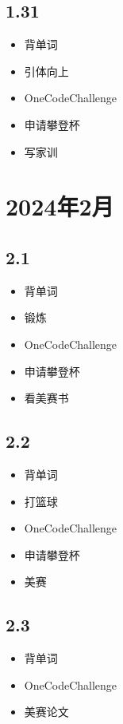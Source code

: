 \documentclass[UTF8]{ctexart}
\begin{document}
\subsection*{1.31}
\begin{itemize}
    \item 背单词
    \item 引体向上
    \item OneCodeChallenge
    \item 申请攀登杯
    \item 写家训
\end{itemize}

\section*{2024年2月}

\subsection*{2.1}
\begin{itemize}
    \item 背单词
    \item 锻炼
    \item OneCodeChallenge
    \item 申请攀登杯
    \item 看美赛书
\end{itemize}

\subsection*{2.2}
\begin{itemize}
    \item 背单词
    \item 打篮球
    \item OneCodeChallenge
    \item 申请攀登杯
    \item 美赛
\end{itemize}

\subsection*{2.3}
\begin{itemize}
    \item 背单词
    \item OneCodeChallenge
    \item 美赛论文
\end{itemize}
\end{document}
